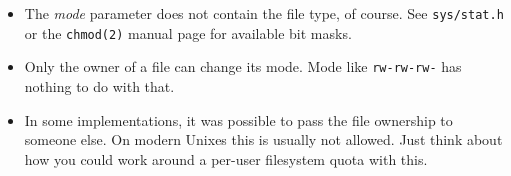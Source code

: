 \begin{itemize}
\item The \emph{mode} parameter does not contain the file type, of course.  See
\texttt{sys/stat.h} or the \texttt{chmod(2)} manual page for available bit
masks.
\item Only the owner of a file can change its mode.  Mode like
\texttt{rw-rw-rw-} has nothing to do with that.
\item In some implementations, it was possible to pass the file ownership to
someone else. On modern Unixes this is usually not allowed.  Just think about how you
could work around a per-user filesystem quota with this.
\end{itemize}

\endinput
